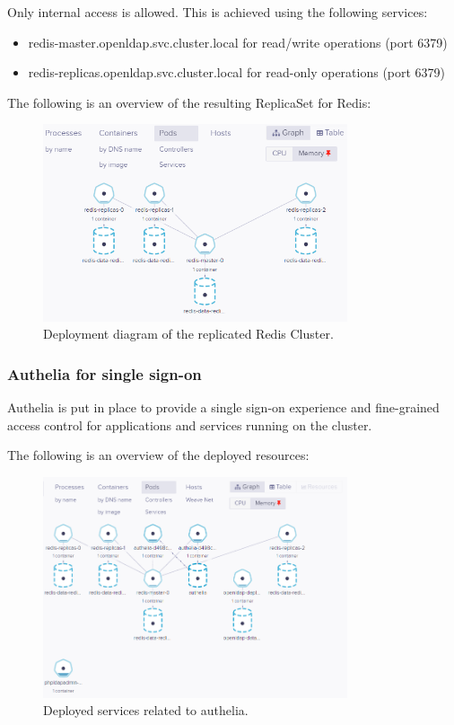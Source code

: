 \hspace{7mm}Only internal access is allowed. This is achieved using the following services: 

\begin{itemize}[label={--}]
\item redis-master.openldap.svc.cluster.local for read/write operations (port 6379) 
\item redis-replicas.openldap.svc.cluster.local for read-only operations (port 6379) 
\end{itemize}
\newpage
\hspace{7mm}The following is an overview of the resulting ReplicaSet for Redis: 

\begin{figure}[H]\centering
\includegraphics[width=0.8\textwidth,angle=00]{assets/f53.png}
\caption{Deployment diagram of the replicated Redis Cluster.}
\label{fig:f53}
\end{figure}

\subsubsection{Authelia for single sign-on }

\hspace{7mm}Authelia is put in place to provide a single sign-on experience and fine-grained access control for applications and services running on the cluster.

\hspace{7mm}The following is an overview of the deployed resources: 
\begin{figure}[H]\centering
\includegraphics[width=0.8\textwidth,angle=00]{assets/f54.png}
\caption{Deployed services related to authelia.}
\label{fig:f54}
\end{figure}

